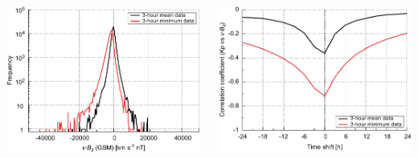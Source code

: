 \documentclass[11pt,aspectratio=1610]{beamer}	%
\newcommand{\captionoftiny}[2]{\captionof{#1}{\color{gray} \tiny #2}}
\begin{document}
\begin{frame}[c]{}{}
	\begin{columns}[c]
		
		\includegraphics[width=\textwidth]{../figures_of_mine/chapter2/histogram_VBzgsm.pdf}


		\includegraphics[width=\textwidth]{../figures_of_mine/chapter2/cc_lag_data_d_KpvsVBzgsm.pdf}
	
	\end{columns}
\end{frame}
\end{document}
